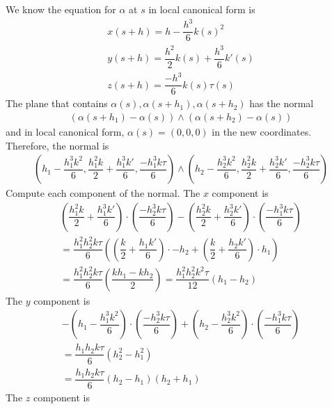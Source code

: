 \documentclass{article}
\begin{document}
	We know the equation for $\alpha$ at $s$ in local canonical form is
	\begin{gather*}
		x(s + h) = h - \dfrac{h^3}{6} k(s)^2 \\
		y(s + h) = \dfrac{h^2}{2} k(s) + \dfrac{h^3}{6} k'(s) \\
		z(s + h) = \dfrac{-h^3}{6} k(s) \tau(s)
	\end{gather*} 
	The plane that contains $\alpha(s), \alpha(s + h_1), \alpha(s + h_2)$ has the normal
	\begin{gather*}
		(\alpha(s + h_1) - \alpha(s)) \wedge (\alpha(s + h_2) - \alpha(s))
	\end{gather*}
	and in local canonical form, $\alpha(s) = (0, 0, 0)$ in the new coordinates. Therefore, the normal is
	\begin{gather*}
		\left( h_1 - \dfrac{h_1^3 k^2}{6}, \dfrac{h_1^2 k}{2} + \dfrac{h_1^3 k'}{6}, \dfrac{-h_1^3 k \tau}{6} \right) \wedge
		\left( h_2 - \dfrac{h_2^3 k^2}{6}, \dfrac{h_2^2 k}{2} + \dfrac{h_2^3 k'}{6}, \dfrac{-h_2^3 k \tau}{6} \right)
	\end{gather*}
	Compute each component of the normal. The $x$ component is
	\begin{gather*}
		\left( \dfrac{h_1^2 k}{2} + \dfrac{h_1^3 k'}{6} \right) \cdot \left( \dfrac{-h_2^3 k \tau}{6} \right) - \left( \dfrac{h_2^2 k}{2} + \dfrac{h_2^3 k'}{6} \right) \cdot \left( \dfrac{-h_1^3 k \tau}{6} \right) \\
		= \dfrac{h_1^2 h_2^2 k \tau}{6} \left( \left( \dfrac{k}{2} + \dfrac{h_1 k'}{6} \right) \cdot -h_2 + \left( \dfrac{k}{2} + \dfrac{h_2 k'}{6} \right) \cdot h_1 \right) \\
		= \dfrac{h_1^2 h_2^2 k \tau}{6} \left( \dfrac{k h_1 - k h_2}{2} \right)
		= \dfrac{h_1^2 h_2^2 k^2 \tau}{12} \left( h_1 - h_2 \right)
	\end{gather*}
	The $y$ component is
	\begin{gather*}
		- \left( h_1 - \dfrac{h_1^3 k^2}{6} \right) \cdot \left( \dfrac{-h_2^3 k \tau}{6} \right) + \left( h_2 - \dfrac{h_2^3 k^2}{6} \right) \cdot \left( \dfrac{-h_1^3 k \tau}{6} \right) \\
		= \dfrac{h_1 h_2 k \tau}{6} \left( h_2^2 - h_1^2 \right) \\
		= \dfrac{h_1 h_2 k \tau}{6} \left( h_2 - h_1 \right) \left( h_2 + h_1 \right)
	\end{gather*}
	The $z$ component is
\end{document}
